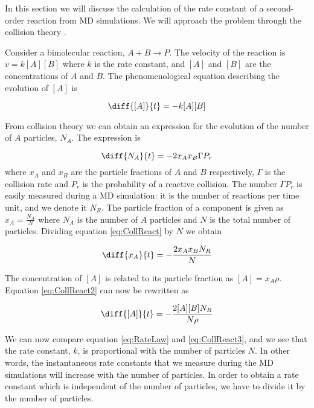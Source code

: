 In this section we will discuss the calculation of the rate constant
of a second-order reaction from MD simulations. We will approach the
problem through the collision theory \cite{Pilling95}. 

Consider a bimolecular reaction, $A+B \rightarrow P$. The velocity of
the reaction is $v=k[A][B]$ where $k$ is the rate constant, and $[A]$
and $[B]$ are the concentrations of $A$ and $B$. The phenomenological
equation describing the evolution of $[A]$ is

\begin{equation}
\label{eq:RateLaw}
  \diff{[A]}{t} = -k[A][B]
\end{equation}

From collision theory we can obtain an expression for the evolution of
the number of $A$ particles, $N_A$. The expression is

\begin{equation}
\label{eq:CollReact}
  \diff{N_A}{t} = -2x_A x_B \Gamma P_r
\end{equation}
where $x_A$ and $x_B$ are the particle fractions of $A$ and $B$
respectively, $\Gamma$ is the collision rate and $P_r$ is the
probability of a reactive collision. The number $\Gamma P_r$ is easily
measured during a MD simulation: it is the number of reactions per
time unit, and we denote it $N_R$. The particle fraction of a
component is given as $x_A = \frac{N_A}{N}$ where $N_A$ is the number
of $A$ particles and $N$ is the total number of particles. Dividing
equation \eqref{eq:CollReact} by $N$ we obtain

\begin{equation}
\label{eq:CollReact2}
  \diff{x_A}{t} = -\frac{2x_Ax_B N_R}{N}
\end{equation}

The concentration of $[A]$ is related to its particle fraction
as $[A] = x_A \rho$. Equation \eqref{eq:CollReact2} can now be
rewritten as

\begin{equation}
\label{eq:CollReact3}
  \diff{[A]}{t} = -\frac{2[A][B] N_R}{N \rho}
\end{equation}

We can now compare equation \eqref{eq:RateLaw} and
\eqref{eq:CollReact3}, and we see that the rate constant, $k$, is
proportional with the number of particles $N$. In other words, the
instantaneous rate constants that we measure during the MD simulations
will increase with the number of particles. In order to obtain a rate
constant which is independent of the number of particles, we have to
divide it by the number of particles.

